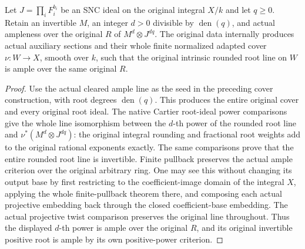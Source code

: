 \begin{theorem}
\label{thm:kn-relative-nadel-rational-cover-ample}
\leanok
{}
Let $J=\prod_i F_i^{b_i}$ be an SNC ideal on the original integral
$X/k$ and let $q\geq0$.  Retain an invertible $M$, an integer $d>0$
divisible by $\operatorname{den}(q)$, and actual ampleness over the
original $R$ of $M^d\otimes J^{dq}$.  The original data internally
produces actual auxiliary sections and their whole finite normalized
adapted cover $\nu:W\to X$, smooth over $k$, such that the original
intrinsic rounded root line on $W$ is ample over the same original $R$.
\end{theorem}
\begin{proof}
Use the actual cleared ample line as the seed in the preceding cover
construction, with root degrees $\operatorname{den}(q)$.  This produces
the entire original cover and every original root ideal.  The native
Cartier root-ideal power comparisons give the whole line isomorphism
between the $d$-th power of the rounded root line and
$\nu^*(M^d\otimes J^{dq})$: the original integral rounding and
fractional root weights add to the original rational exponents exactly.
The same comparisons prove that the entire rounded root line is
invertible.  Finite pullback preserves the actual ample criterion over
the original arbitrary ring.  One may see this without changing its
output base by first restricting to the coefficient-image domain of
the integral $X$, applying the whole finite-pullback theorem there,
and composing each actual projective embedding back through the closed
coefficient-base embedding.  The actual projective twist comparison
preserves the original line throughout.  Thus the displayed $d$-th
power is ample over the original $R$, and its original invertible
positive root is ample by its own positive-power criterion.
\end{proof}
